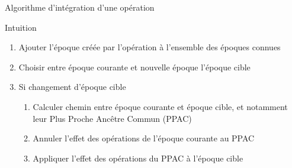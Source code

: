 \begin{frame}{Algorithme d'intégration d'une opération \ren}
  \begin{block}{Intuition}
    \begin{enumerate}
      \item<2-> Ajouter l'époque créée par l'opération \ren à l'ensemble des époques connues
      \item<3-> Choisir entre époque courante et nouvelle époque \alert{l'époque cible}
      \item<4-> Si changement d'époque cible
      \begin{enumerate}
        \item<5-> Calculer chemin entre époque courante et époque cible, et notamment leur Plus Proche Ancêtre Commun (PPAC)
        \item<6-> Annuler l'effet des opérations \ren de l'époque courante au PPAC
        \item<7-> Appliquer l'effet des opérations \ren du PPAC à l'époque cible
      \end{enumerate}
    \end{enumerate}
  \end{block}
\end{frame}

